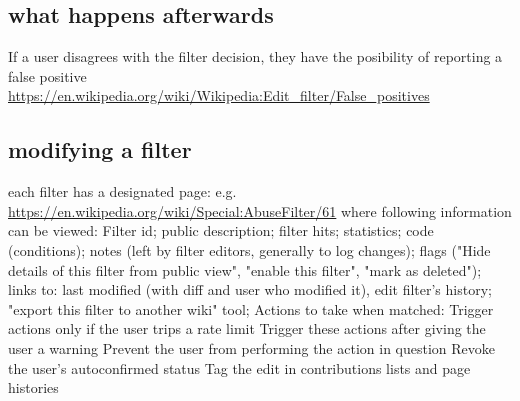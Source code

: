 \documentclass{sigchi}
\begin{document}

\subsection{what happens afterwards}

If a user disagrees with the filter decision, they have the posibility of reporting a false positive
\url{https://en.wikipedia.org/wiki/Wikipedia:Edit_filter/False_positives}

\subsection{modifying a filter}

each filter has a designated page: e.g. \url{https://en.wikipedia.org/wiki/Special:AbuseFilter/61}
where following information can be viewed:
Filter id; public description; filter hits; statistics; code (conditions); notes (left by filter editors, generally to log changes); flags ("Hide details of this filter from public view", "enable this filter", "mark as deleted");
links to: last modified (with diff and user who modified it), edit filter's history; "export this filter to another wiki" tool;
Actions to take when matched:
Trigger actions only if the user trips a rate limit
Trigger these actions after giving the user a warning
Prevent the user from performing the action in question
Revoke the user's autoconfirmed status
Tag the edit in contributions lists and page histories
\end{document}
